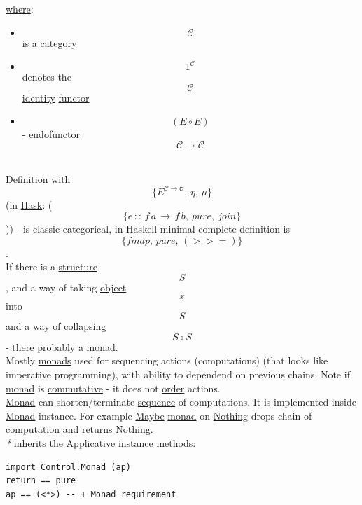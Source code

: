 \documentclass[11pt]{article}
\begin{document}
\hyperref[orgefd1ecd]{where}:\\
\begin{itemize}
\item $$ \mathcal{C} $$ is a \hyperref[org3e3a79b]{category}\\
\item $$ 1^{\mathcal{C}} $$ denotes the $$ \mathcal{C} $$ \hyperref[org3bbbadd]{identity} \hyperref[org6073683]{functor}\\
\item $$ (E \circ E) $$ - \hyperref[org4dce7a1]{endofunctor} $$ \mathcal{C \to C} $$\\
\end{itemize}

Definition with $$ \{E^{\mathcal{C \to C}}, \, \eta, \, \mu\} $$ (in \hyperref[org79be162]{Hask}: ($$ \{e \, :: \, f \, a \, \to \, f \, b, \ pure, \ join\} $$)) - is classic categorical, in Haskell minimal complete definition is $$ \{fmap, \, pure, \, (>>=)\} $$.\\

If there is a \hyperref[org93ee82c]{structure} $$ S $$, and a way of taking \hyperref[org025aac8]{object} $$ x $$ into $$ S $$ and a way of collapsing $$ S \circ S $$ - there probably a \hyperref[org268aaf1]{monad}.\\

Mostly \hyperref[org3ecde32]{monads} used for sequencing actions (computations) (that looks like imperative programming), with ability to dependend on previous chains. Note if \hyperref[org268aaf1]{monad} is \hyperref[orgcb2a02d]{commutative} - it does not \hyperref[org8544276]{order} actions.\\

\hyperref[org268aaf1]{Monad} can shorten/terminate \hyperref[orgf90a45c]{sequence} of computations. It is implemented inside \hyperref[org268aaf1]{Monad} instance. For example \hyperref[orga420584]{Maybe} \hyperref[org268aaf1]{monad} on \hyperref[org235dcde]{Nothing} drops chain of computation and returns \hyperref[org235dcde]{Nothing}.\\

\emph{*} inherits the \hyperref[org24a6930]{Applicative} instance methods:\\
\begin{verbatim}
import Control.Monad (ap)
return == pure
ap == (<*>) -- + Monad requirement
\end{verbatim}
\end{document}
